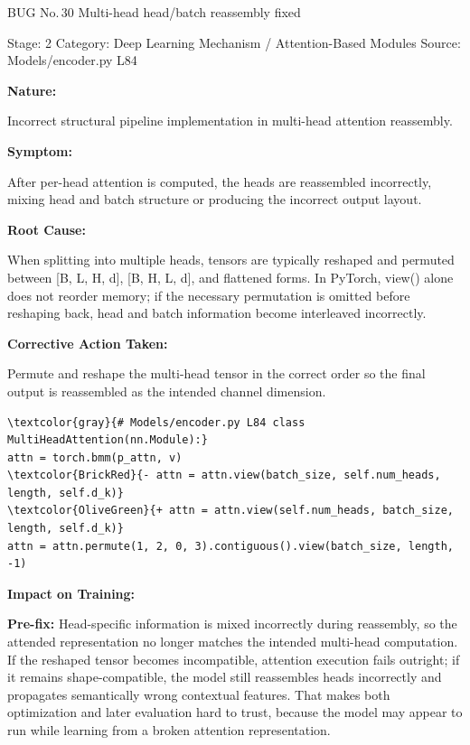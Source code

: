 \documentclass[10pt]{article}
\newcommand{\FieldLabel}[1]{%
 {\bfseries #1:}\par
}
\begin{document}
\begin{bugbox}{BUG No.\,30 \quad Multi-head head/batch reassembly fixed}
{\color{MetaGray}\small Stage: 2 \;\textbar\; Category: Deep Learning Mechanism / Attention-Based Modules \;\textbar\; Source: Models/encoder.py L84\par}
\vspace{0.22em}
\FieldLabel{Nature}
Incorrect structural pipeline implementation in multi-head attention reassembly.
\par
\vspace{0.35em}
\FieldLabel{Symptom}
After per-head attention is computed, the heads are reassembled incorrectly, mixing head and batch structure or producing the incorrect output layout.
\par
\vspace{0.35em}
\FieldLabel{Root Cause}
When splitting into multiple heads, tensors are typically reshaped and permuted between {[}B, L, H, d{]}, {[}B, H, L, d{]}, and flattened forms. In PyTorch, view() alone does not reorder memory; if the necessary permutation is omitted before reshaping back, head and batch information become interleaved incorrectly.
\par
\vspace{0.35em}
\FieldLabel{Corrective Action Taken}
Permute and reshape the multi-head tensor in the correct order so the final output is reassembled as the intended channel dimension.
\par
\vspace{0.35em}
\begin{Verbatim}[commandchars=\\\{\},fontsize=\footnotesize,breaklines=true,breaksymbol={},frame=leftline,framerule=2pt,rulecolor=\color{gray!40},xleftmargin=6pt,formatcom=\singlespacing]
\textcolor{gray}{# Models/encoder.py L84 class MultiHeadAttention(nn.Module):}
attn = torch.bmm(p_attn, v)
\textcolor{BrickRed}{- attn = attn.view(batch_size, self.num_heads, length, self.d_k)}
\textcolor{OliveGreen}{+ attn = attn.view(self.num_heads, batch_size, length, self.d_k)}
attn = attn.permute(1, 2, 0, 3).contiguous().view(batch_size, length, -1)
\end{Verbatim}
\vspace{0.22em}
\FieldLabel{Impact on Training}
\textbf{Pre-fix:} Head-specific information is mixed incorrectly during reassembly, so the attended representation no longer matches the intended multi-head computation. If the reshaped tensor becomes incompatible, attention execution fails outright; if it remains shape-compatible, the model still reassembles heads incorrectly and propagates semantically wrong contextual features. That makes both optimization and later evaluation hard to trust, because the model may appear to run while learning from a broken attention representation.\par\smallskip

\end{bugbox}
\end{document}
